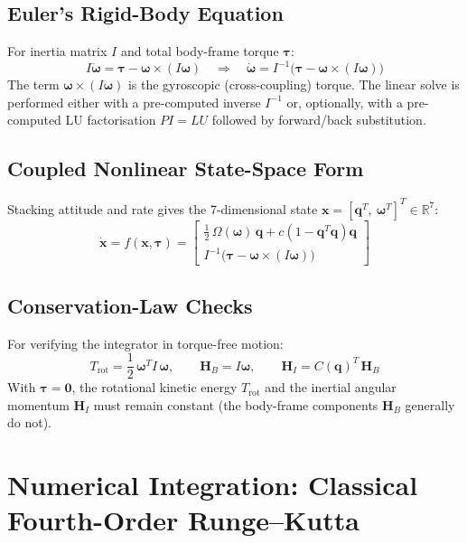 \documentclass[11pt, a4paper]{article}
\newcommand{\vect}[1]{\boldsymbol{#1}}
\newcommand{\w}{\vect{\omega}}
\begin{document}
\subsection{Euler's Rigid-Body Equation}
For inertia matrix $I$ and total body-frame torque $\vect{\tau}$:
\begin{equation}
I \dot{\w} = \vect{\tau} - \w \times (I \w)
\quad\Longrightarrow\quad
\dot{\w} = I^{-1} \big( \vect{\tau} - \w \times (I \w) \big)
\end{equation}
The term $\w \times (I\w)$ is the gyroscopic (cross-coupling) torque. The linear solve is performed either with a pre-computed inverse $I^{-1}$ or, optionally, with a pre-computed LU factorisation $P I = L U$ followed by forward/back substitution.

\subsection{Coupled Nonlinear State-Space Form}
Stacking attitude and rate gives the 7-dimensional state $\vect{x} = [\vect{q}^T,\ \w^T]^T \in \mathbb{R}^7$:
\begin{equation}
\dot{\vect{x}} = f(\vect{x}, \vect{\tau}) =
\begin{bmatrix}
\tfrac{1}{2}\, \Omega(\w)\, \vect{q} + c \left( 1 - \vect{q}^T \vect{q} \right) \vect{q} \\[1ex]
I^{-1} \big( \vect{\tau} - \w \times (I \w) \big)
\end{bmatrix}
\end{equation}

\subsection{Conservation-Law Checks}
For verifying the integrator in torque-free motion:
\begin{equation}
T_{\text{rot}} = \frac{1}{2}\, \w^T I\, \w,
\qquad
\vect{H}_B = I \w,
\qquad
\vect{H}_I = C(\vect{q})^T\, \vect{H}_B
\end{equation}
With $\vect{\tau} = \vect{0}$, the rotational kinetic energy $T_{\text{rot}}$ and the inertial angular momentum $\vect{H}_I$ must remain constant (the body-frame components $\vect{H}_B$ generally do not).

\section{Numerical Integration: Classical Fourth-Order Runge--Kutta}
\end{document}
